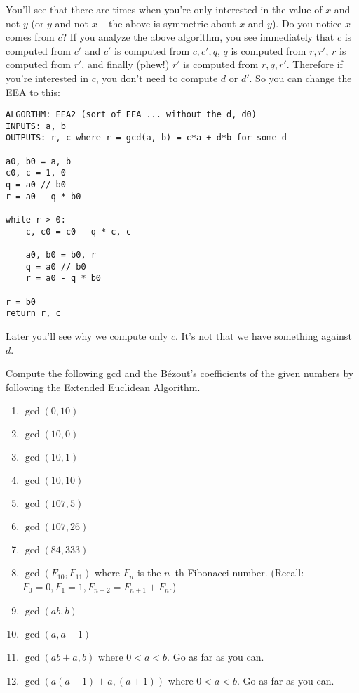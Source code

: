 You'll see that there are times when you're only interested in 
the value of $x$ and not $y$ (or $y$ and not $x$ -- the above is symmetric
about $x$ and $y$).
Do you notice $x$ comes from $c$?
If you analyze the above algorithm, you see immediately that $c$
is computed from $c'$ and $c'$ is computed from $c,c',q$, 
$q$ is computed from $r, r'$, $r$ is computed from $r'$,
and finally (phew!) $r'$ is computed from $r, q, r'$.
Therefore if you're interested in $c$, you don't need to compute $d$ 
or $d'$.
So you can change the EEA to this:

\begin{Verbatim}[frame=single, fontsize=\small]
ALGORTHM: EEA2 (sort of EEA ... without the d, d0)
INPUTS: a, b
OUTPUTS: r, c where r = gcd(a, b) = c*a + d*b for some d

a0, b0 = a, b
c0, c = 1, 0
q = a0 // b0
r = a0 - q * b0

while r > 0:   
    c, c0 = c0 - q * c, c

    a0, b0 = b0, r
    q = a0 // b0
    r = a0 - q * b0

r = b0
return r, c
\end{Verbatim}

Later you'll see why we compute only $c$.
It's not that we have something against $d$.

\newpage
\begin{ex}
  Compute the following gcd and the B\'ezout's coefficients of the
  given numbers by following the Extended Euclidean Algorithm.
  \begin{enumerate}[nosep]
  \item $\gcd(0, 10)$
  \item $\gcd(10, 0)$
  \item $\gcd(10, 1)$
  \item $\gcd(10, 10)$
  \item $\gcd(107, 5)$
  \item $\gcd(107, 26)$
  \item $\gcd(84, 333)$
  \item $\gcd(F_{10}, F_{11})$ where $F_n$ is the $n$--th Fibonacci number.
    (Recall: $F_0 = 0, F_1 = 1, F_{n + 2} = F_{n + 1} + F_n$.)
  \item $\gcd(ab, b)$
  \item $\gcd(a, a + 1)$
  \item $\gcd(ab + a, b)$ where $0 < a < b$. Go as far as you can.
  \item $\gcd(a(a+1) + a, (a+1))$ where $0 < a < b$. Go as far as you can.
  \end{enumerate}
\end{ex}

